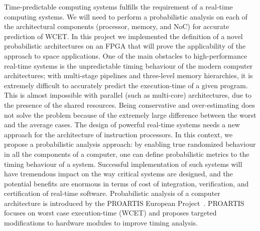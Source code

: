 Time-predictable computing systems fulfills the requirement of a real-time computing systems. We will need to perform a probabilistic analysis on each of the architectural components (processor, memory, and NoC) for accurate prediction of WCET. In this project we implemented  the definition of a novel probabilistic architectures on an FPGA that will prove the applicability of the approach to space applications. One of the main obstacles to high-performance real-time  systems is the unpredictable timing behaviour of the modern
computer architectures; with multi-stage pipelines and three-level memory hierarchies, it is extremely difficult to accurately predict the execution-time of a given program. This is almost impossible with parallel (such as multi-core) architectures, due to the presence of the shared resources. Being conservative and over-estimating does not solve the problem because of the extremely large difference between the  worst
and the average cases. The design of powerful real-time systems needs a new approach for the architecture
of instruction processors. In this context, we propose a probabilistic analysis approach: by enabling true randomized behaviour in all the components of a computer, one can define probabilistic metrics to the timing behaviour of a system. Successful implementation of such systems will have tremendous impact on the way critical systems are designed, and the potential benefits are enormous in terms of cost of integration, verification, and certification of real-time software. Probabilistic
analysis of a computer architecture is introduced by the PROARTIS European Project~\cite{Cazorla:2013:PPA:2465787.2465796}. PROARTIS focuses on worst case execution-time
(WCET) and proposes targeted modifications to hardware modules to improve timing analysis.

